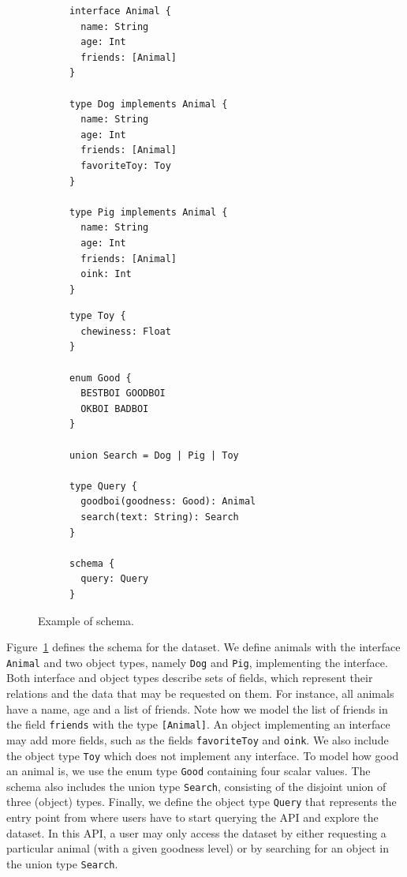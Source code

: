 \begin{figure}
    \centering
    \begin{subfigure}{.5\linewidth}
    
    \begin{verbatim}
interface Animal {		
  name: String
  age: Int
  friends: [Animal]
}

type Dog implements Animal {
  name: String
  age: Int
  friends: [Animal]
  favoriteToy: Toy
}

type Pig implements Animal {
  name: String
  age: Int
  friends: [Animal]
  oink: Int
}
    \end{verbatim}
    \end{subfigure}%
    \begin{subfigure}{.5\linewidth}
    \begin{verbatim}
type Toy {
  chewiness: Float
}

enum Good { 
  BESTBOI GOODBOI 
  OKBOI BADBOI 
}

union Search = Dog | Pig | Toy

type Query {
  goodboi(goodness: Good): Animal
  search(text: String): Search
}

schema {
  query: Query
}
    \end{verbatim}
    \end{subfigure}
    
    \caption{Example of \gql schema.}
    \label{fig:schema_ex}
\end{figure}

Figure~\ref{fig:schema_ex} defines the schema for the \goodbois dataset.
We define animals with the interface \texttt{Animal} and two object
types, namely \texttt{Dog} and \texttt{Pig}, implementing the interface. 
Both interface and object types describe sets of fields, which represent their relations and the data that may be requested on them. 
For instance, all animals have a name, age and a list of friends. Note how we model the list of friends in the field \texttt{friends} with the type \texttt{[Animal]}.
An object implementing an interface may add more fields, such as the fields \texttt{favoriteToy} and \texttt{oink}.
We also include the object type \texttt{Toy} which does not implement any interface. 
To model how good an animal is, we use the enum type \texttt{Good}
containing four scalar values. %
The schema also includes the union type \texttt{Search}, consisting of
the disjoint union of three (object) types. %
Finally, we define the object type \texttt{Query} that represents the entry point from where users have to 
start querying the API and explore the dataset. In this API, a user may only access the \goodbois dataset by 
either requesting a particular animal (with a given goodness level) or by searching for an object in the union type \texttt{Search}.



